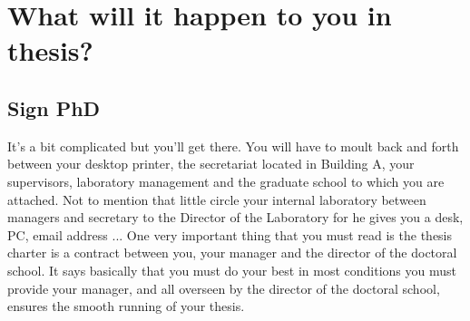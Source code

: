 \chapter{What will it happen to you in thesis?}

\section{Sign PhD}
It's a bit complicated but you'll get there.
You will have to moult back and forth between your desktop printer, the secretariat located in Building A, your supervisors, laboratory management and the graduate school to which you are attached.
Not to mention that little circle your internal laboratory between managers and secretary to the Director of the Laboratory for he gives you a desk, PC, email address ...
One very important thing that you must read is the thesis charter is a contract between you, your manager and the director of the doctoral school.
It says basically that you must do your best in most conditions you must provide your manager, and all overseen by the director of the doctoral school, ensures the smooth running of your thesis.

